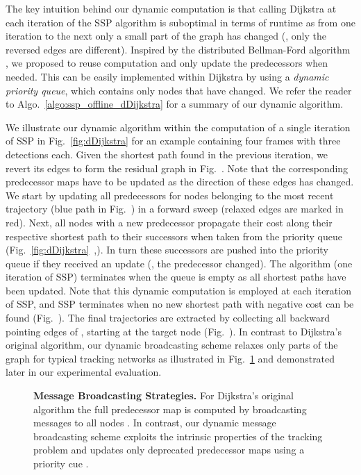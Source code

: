 \documentclass[10pt,twocolumn,letterpaper]{article}
\newcommand{\figref}[1]{Fig.~\ref{#1}}
\newcommand{\subfigref}[1]{Fig.~\subref*{#1}}
\newcommand{\algref}[1]{Algo.~\ref{#1}}
\begin{document}
The  key intuition behind our dynamic computation is that calling Dijkstra at each iteration of the SSP algorithm is suboptimal in terms of runtime as from one iteration to the next only a small part of the graph has changed (\ie, only the  reversed edges are different). 
Inspired by the distributed Bellman-Ford algorithm 
\cite{Bertsekas1992,Walden2003}, we proposed to reuse computation and  only update the  predecessors when needed. This can be easily implemented within Dijkstra by using a {\it dynamic priority queue}, which contains only nodes that have changed.  
We refer the reader to \algref{algo:ssp_offline_dDijkstra} for a summary of our dynamic algorithm. 

We illustrate our dynamic algorithm  within the computation of a single iteration of SSP in \figref{fig:dDijkstra} for an example containing four frames with three detections each. 
Given the shortest path found in the previous iteration, we revert its edges to form the residual graph in \subfigref{fig:dDijkstra:a}. Note that the corresponding predecessor maps have to be updated as the direction of these edges has changed. 
We start by updating all predecessors for nodes belonging to the most recent trajectory (blue path in \subfigref{fig:dDijkstra:a}) in a forward sweep (relaxed edges are marked in red). Next, all nodes with a new predecessor propagate their cost along their respective shortest path to their successors when taken from the priority queue (\figref{fig:dDijkstra}~,). 
In turn these successors are pushed into the priority queue if they received an update (\ie, the predecessor changed). 
The algorithm (one iteration of SSP) terminates when the queue is empty as all shortest paths have been updated.
Note that this dynamic computation is employed at each iteration of SSP, and  
SSP  terminates when no new shortest path with negative cost can be found (\subfigref{fig:dDijkstra:d}). The final trajectories are  extracted by collecting all backward pointing edges of , starting at the target node (\subfigref{fig:dDijkstra:e}).
In contrast to Dijkstra's original algorithm, our dynamic broadcasting scheme relaxes only parts of the graph for typical tracking networks as illustrated in \figref{fig:dDijkstraComparison} and demonstrated later in our experimental evaluation.

\begin{figure}[t!]
\centering
{}
\qquad
{}
\caption{{\bf Message Broadcasting Strategies.} For Dijkstra's original algorithm the full predecessor map is computed by broadcasting messages to all nodes \protect{}. In contrast, our dynamic message broadcasting scheme exploits the intrinsic properties of the tracking problem and updates only deprecated predecessor maps using a priority cue \protect{}.}
\label{fig:dDijkstraComparison}
\end{figure}
\end{document}
